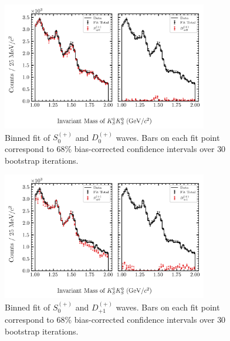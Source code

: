 \begin{figure}
  \begin{center}
    \includegraphics[width=0.8\textwidth]{figures/binned_fit_chisqdof_3.4_splot_D_1s_2b_phase_factor_waves487_uncertainty_bootstrap-CI-BC.png}
  \end{center}
  \caption{Binned fit of $S_{0}^{(+)}$ and $D_{0}^{(+)}$ waves. Bars on each fit point correspond to $68\%$ bias-corrected confidence intervals over $ 30 $ bootstrap iterations.}\label{fig:binned-fit-chisqdof-3.4-Sp-D0p}
\end{figure}
\begin{figure}
  \begin{center}
    \includegraphics[width=0.8\textwidth]{figures/binned_fit_chisqdof_3.4_splot_D_1s_2b_phase_factor_waves489_uncertainty_bootstrap-CI-BC.png}
  \end{center}
  \caption{Binned fit of $S_{0}^{(+)}$ and $D_{+1}^{(+)}$ waves. Bars on each fit point correspond to $68\%$ bias-corrected confidence intervals over $ 30 $ bootstrap iterations.}\label{fig:binned-fit-chisqdof-3.4-Sp-D1p}
\end{figure}
